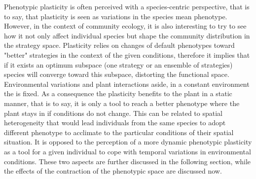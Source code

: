 Phenotypic plasticity is often perceived with a species-centric perspective, that is to say, that plasticity is seen as variations in the species mean phenotype. However, in the context of community ecology, it is also interesting to try to see how it not only affect individual species but shape the community distribution in the strategy space. Plasticity relies on changes of default phenotypes toward "better" strategies in the context of the given conditions, therefore it implies that if it exists an optimum subspace (one strategy or an ensemble of strategies) species will converge toward this subspace, distorting the functional space. Environmental variations and plant interactions aside, in a constant environment the  is fixed. As a consequence the plasticity benefits to the plant in a static manner, that is to say, it is only a tool to reach a better phenotype where the plant stays in if conditions do not change. This can be related to spatial heterogeneity that would lead individuals from the same species to adopt different phenotype to acclimate to the particular conditions of their spatial situation. It is opposed to the perception of a more dynamic phenotypic plasticity as a tool for a given individual to cope with temporal variations in environmental conditions. These two aspects are further discussed in the following section, while the effects of the contraction of the phenotypic space are discussed now.

